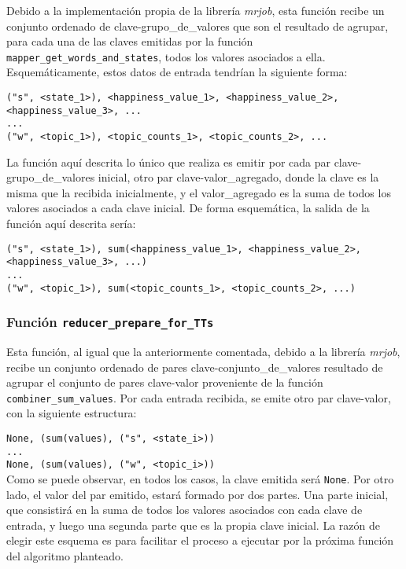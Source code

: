 \documentclass[10pt, spanish]{article}
\begin{document}
Debido a la implementación propia de la librería \textit{mrjob}, esta función recibe un conjunto ordenado de clave-grupo\_de\_valores que son el resultado de agrupar, para cada una de las claves emitidas por la función \texttt{mapper\_get\_words\_and\_states}, todos los valores asociados a ella. Esquemáticamente, estos datos de entrada tendrían la siguiente forma:

\texttt{("s", <state\_1>), <happiness\_value\_1>, <happiness\_value\_2>, <happiness\_value\_3>, ...}\\
\texttt{...}\\
\texttt{("w", <topic\_1>), <topic\_counts\_1>, <topic\_counts\_2>, ...}

La función aquí descrita lo único que realiza es emitir por cada par clave-grupo\_de\_valores inicial, otro par clave-valor\_agregado, donde la clave es la misma que la recibida inicialmente, y el valor\_agregado es la suma de todos los valores asociados a cada clave inicial. De forma esquemática, la salida de la función aquí descrita sería:

\texttt{("s", <state\_1>), sum(<happiness\_value\_1>, <happiness\_value\_2>, <happiness\_value\_3>, ...)}\\
\texttt{...}\\
\texttt{("w", <topic\_1>), sum(<topic\_counts\_1>, <topic\_counts\_2>, ...)}

\subsubsection{Función \texttt{reducer\_prepare\_for\_TTs}}

Esta función, al igual que la anteriormente comentada, debido a la librería \textit{mrjob}, recibe un conjunto ordenado de pares clave-conjunto\_de\_valores resultado de agrupar el conjunto de pares clave-valor proveniente de la función \texttt{combiner\_sum\_values}. Por cada entrada recibida, se emite otro par clave-valor, con la siguiente estructura:

\texttt{None, (sum(values), ("s", <state\_i>))}\\
\texttt{...}\\
\texttt{None, (sum(values), ("w", <topic\_i>))}\\

Como se puede observar, en todos los casos, la clave emitida será \texttt{None}. Por otro lado, el valor del par emitido, estará formado por dos partes. Una parte inicial, que consistirá en la suma de todos los valores asociados con cada clave de entrada, y luego una segunda parte que es la propia clave inicial. La razón de elegir este esquema es para facilitar el proceso a ejecutar por la próxima función del algoritmo planteado.
\end{document}

